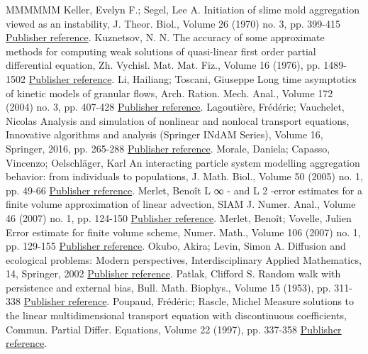 \documentclass[11pt]{article}
\theoremstyle{definition}
\numberwithin{equation}{section}
\begin{document}
\begin{thebibliography}{MMMMMM}
 Keller, Evelyn F.; Segel, Lee A. Initiation of slime mold aggregation viewed as an instability, J. Theor. Biol., Volume 26 (1970) no. 3, pp. 399-415 \href{https://ahl.centre-mersenne.org/item/AHL_2020__3__217_0/#keller}{Publisher reference}.
 Kuznetsov, N. N. The accuracy of some approximate methods for computing weak solutions of quasi-linear first order partial differential equation, Zh. Vychisl. Mat. Mat. Fiz., Volume 16 (1976), pp. 1489-1502 \href{https://ahl.centre-mersenne.org/item/AHL_2020__3__217_0/#Kuznetsov}{Publisher reference}.
 Li, Hailiang; Toscani, Giuseppe Long time asymptotics of kinetic models of granular flows, Arch. Ration. Mech. Anal., Volume 172 (2004) no. 3, pp. 407-428 \href{https://ahl.centre-mersenne.org/item/AHL_2020__3__217_0/#Li}{Publisher reference}.
 Lagoutière, Frédéric; Vauchelet, Nicolas Analysis and simulation of nonlinear and nonlocal transport equations, Innovative algorithms and analysis (Springer INdAM Series), Volume 16, Springer, 2016, pp. 265-288 \href{https://ahl.centre-mersenne.org/item/AHL_2020__3__217_0/#lava}{Publisher reference}.
 Morale, Daniela; Capasso, Vincenzo; Oelschläger, Karl An interacting particle system modelling aggregation behavior: from individuals to populations, J. Math. Biol., Volume 50 (2005) no. 1, pp. 49-66 \href{https://ahl.centre-mersenne.org/item/AHL_2020__3__217_0/#morale}{Publisher reference}.
 Merlet, Benoît L ∞ - and L 2 -error estimates for a finite volume approximation of linear advection, SIAM J. Numer. Anal., Volume 46 (2007) no. 1, pp. 124-150 \href{https://ahl.centre-mersenne.org/item/AHL_2020__3__217_0/#M}{Publisher reference}.
 Merlet, Benoît; Vovelle, Julien Error estimate for finite volume scheme, Numer. Math., Volume 106 (2007) no. 1, pp. 129-155 \href{https://ahl.centre-mersenne.org/item/AHL_2020__3__217_0/#MV}{Publisher reference}.
 Okubo, Akira; Levin, Simon A. Diffusion and ecological problems: Modern perspectives, Interdisciplinary Applied Mathematics, 14, Springer, 2002 \href{https://ahl.centre-mersenne.org/item/AHL_2020__3__217_0/#okubo}{Publisher reference}.
 Patlak, Clifford S. Random walk with persistence and external bias, Bull. Math. Biophys., Volume 15 (1953), pp. 311-338 \href{https://ahl.centre-mersenne.org/item/AHL_2020__3__217_0/#patlack}{Publisher reference}.
 Poupaud, Frédéric; Rascle, Michel Measure solutions to the linear multidimensional transport equation with discontinuous coefficients, Commun. Partial Differ. Equations, Volume 22 (1997), pp. 337-358 \href{https://ahl.centre-mersenne.org/item/AHL_2020__3__217_0/#PoupaudRascle}{Publisher reference}.

\end{thebibliography}
\end{document}
